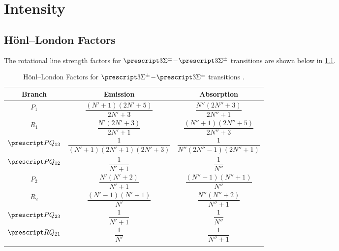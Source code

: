 \chapter{Intensity}

\section{H\"onl--London Factors}

The rotational line strength factors for $\state{3}{\Sigma}^{\pm}\dash\state{3}{\Sigma}^{\pm}$ transitions are shown below in \cref{t:honl_london_factors_3s}.
\begin{table}[H]
    \centering
    \caption{H\"onl--London Factors for $\state{3}{\Sigma}^{\pm}\dash\state{3}{\Sigma}^{\pm}$ transitions \cite[2945]{tatumHonlLondonFactors1966}.}
    \label{t:honl_london_factors_3s}
    \begin{tabular}{ccc}
        \toprule
        Branch              & Emission                                & Absorption                                 \\
        \midrule
        $P_1$             & $\dfrac{(N' + 1)(2N' + 5)}{2N' + 3}$    & $\dfrac{N''(2N'' + 3)}{2N'' + 1}$          \\
        \addlinespace[0.5em]
        $R_1$             & $\dfrac{N'(2N' + 3)}{2N' + 1}$          & $\dfrac{(N'' + 1)(2N'' + 5)}{2N'' + 3}$    \\
        \addlinespace[0.5em]
        $\state{P}{Q}_{13}$ & $\dfrac{1}{(N' + 1)(2N' + 1)(2N' + 3)}$ & $\dfrac{1}{N''(2N'' - 1)(2N'' + 1)}$       \\
        \addlinespace[0.5em]
        $\state{P}{Q}_{12}$ & $\dfrac{1}{N' + 1}$                     & $\dfrac{1}{N''}$                           \\
        \addlinespace[0.5em]
        $P_2$             & $\dfrac{N'(N' + 2)}{N' + 1}$            & $\dfrac{(N'' - 1)(N'' + 1)}{N''}$          \\
        \addlinespace[0.5em]
        $R_2$             & $\dfrac{(N' - 1)(N' + 1)}{N'}$          & $\dfrac{N''(N'' + 2)}{N'' + 1}$            \\
        \addlinespace[0.5em]
        $\state{P}{Q}_{23}$ & $\dfrac{1}{N' + 1}$                     & $\dfrac{1}{N''}$                           \\
        \addlinespace[0.5em]
        $\state{R}{Q}_{21}$ & $\dfrac{1}{N'}$                         & $\dfrac{1}{N'' + 1}$                       \\
        \addlinespace[0.5em]

\end{tabular}
\end{table}
